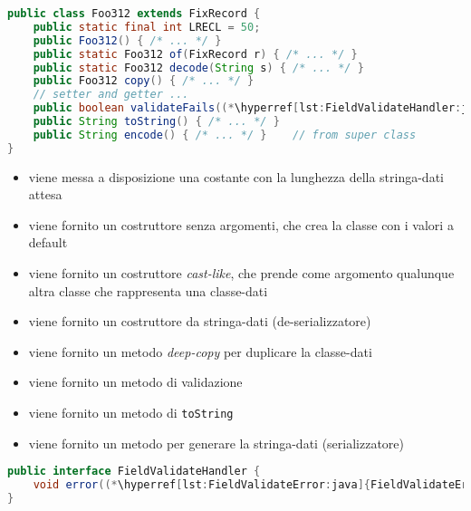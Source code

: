 \documentclass[a4paper,10pt]{report}
\begin{document}
\begin{figure*}[!htb]
\begin{lstlisting}[language=java, caption=esempio di classe generata (Foo312), 
label=lst:Foo312:java]
public class Foo312 extends FixRecord {
    public static final int LRECL = 50;
    public Foo312() { /* ... */ }
    public static Foo312 of(FixRecord r) { /* ... */ }
    public static Foo312 decode(String s) { /* ... */ }
    public Foo312 copy() { /* ... */ }
    // setter and getter ...
    public boolean validateFails((*\hyperref[lst:FieldValidateHandler:java]{FieldValidateHandler}*) handler) { /* ... */ }
    public String toString() { /* ... */ }
    public String encode() { /* ... */ }    // from super class
}
\end{lstlisting}
\end{figure*}

\begin{itemize}
\item viene messa a disposizione una costante con la lunghezza della 
    stringa-dati attesa
\item viene fornito un costruttore senza argomenti, che crea la classe con i 
    valori a default
\item viene fornito un costruttore \textit{cast-like}, che prende come argomento
    qualunque altra classe che rappresenta una classe-dati
\item viene fornito un costruttore da stringa-dati (de-serializzatore)
\item viene fornito un metodo \textit{deep-copy} per duplicare la classe-dati
\item viene fornito un metodo di validazione
\item viene fornito un metodo di \texttt{toString}
\item viene fornito un metodo per generare la stringa-dati (serializzatore)
\end{itemize}


\begin{figure*}[!htb]
\begin{lstlisting}[language=java, 
caption={gestore errori \texttt{FieldValidateHandler}}, 
label=lst:FieldValidateHandler:java]
public interface FieldValidateHandler {
    void error((*\hyperref[lst:FieldValidateError:java]{FieldValidateError}*) fieldValidateError);
}
\end{lstlisting}
\end{figure*}
\end{document}
